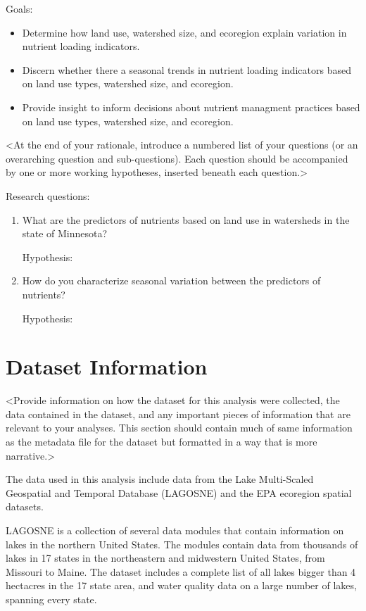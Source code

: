 \documentclass[12pt,]{article}
\providecommand{\tightlist}{%
  \setlength{\itemsep}{0pt}\setlength{\parskip}{0pt}}
\begin{document}
Goals:

\begin{itemize}
\tightlist
\item
  Determine how land use, watershed size, and ecoregion explain
  variation in nutrient loading indicators.
\item
  Discern whether there a seasonal trends in nutrient loading indicators
  based on land use types, watershed size, and ecoregion.
\item
  Provide insight to inform decisions about nutrient managment practices
  based on land use types, watershed size, and ecoregion.
\end{itemize}

\textless At the end of your rationale, introduce a numbered list of
your questions (or an overarching question and sub-questions). Each
question should be accompanied by one or more working hypotheses,
inserted beneath each question.\textgreater{}

Research questions:

\begin{enumerate}
\def\labelenumi{\arabic{enumi}.}
\item
  What are the predictors of nutrients based on land use in watersheds
  in the state of Minnesota?

  Hypothesis:
\item
  How do you characterize seasonal variation between the predictors of
  nutrients?

  Hypothesis:
\end{enumerate}

\newpage

\hypertarget{dataset-information}{%
\section{Dataset Information}\label{dataset-information}}

\textless Provide information on how the dataset for this analysis were
collected, the data contained in the dataset, and any important pieces
of information that are relevant to your analyses. This section should
contain much of same information as the metadata file for the dataset
but formatted in a way that is more narrative.\textgreater{}

The data used in this analysis include data from the Lake Multi-Scaled
Geospatial and Temporal Database (LAGOSNE) and the EPA ecoregion spatial
datasets.

LAGOSNE is a collection of several data modules that contain information
on lakes in the northern United States. The modules contain data from
thousands of lakes in 17 states in the northeastern and midwestern
United States, from Missouri to Maine. The dataset includes a complete
list of all lakes bigger than 4 hectacres in the 17 state area, and
water quality data on a large number of lakes, spanning every state.
\end{document}
